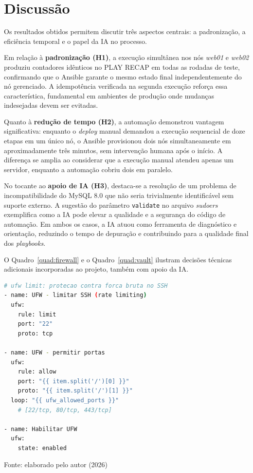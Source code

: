 \documentclass[12pt]{article}
\newenvironment{quadro}[1][H]
  {\begin{table}[#1]\centering}
  {\end{table}}
\newcommand{\fonte}[1]{%
  \begin{flushleft}
    \footnotesize Fonte: #1
  \end{flushleft}%
}
\begin{document}
\section{Discussão}

Os resultados obtidos permitem discutir três aspectos centrais: a
padronização, a eficiência temporal e o papel da IA no processo.

Em relação à \textbf{padronização (H1)}, a execução simultânea nos nós
\textit{web01} e \textit{web02} produziu contadores idênticos no PLAY RECAP
em todas as rodadas de teste, confirmando que o Ansible garante o mesmo
estado final independentemente do nó gerenciado. A idempotência verificada
na segunda execução reforça essa característica, fundamental em ambientes de
produção onde mudanças indesejadas devem ser evitadas.

Quanto à \textbf{redução de tempo (H2)}, a automação demonstrou vantagem
significativa: enquanto o \textit{deploy} manual demandou a execução
sequencial de doze etapas em um único nó, o Ansible provisionou dois nós
simultaneamente em aproximadamente três minutos, sem intervenção humana após
o início. A diferença se amplia ao considerar que a execução manual atendeu
apenas um servidor, enquanto a automação cobriu dois em paralelo.

No tocante ao \textbf{apoio de IA (H3)}, destaca-se a resolução de um
problema de incompatibilidade do MySQL 8.0 que não seria trivialmente
identificável sem suporte externo. A sugestão do parâmetro \texttt{validate}
no arquivo \textit{sudoers} exemplifica como a IA pode elevar a qualidade e
a segurança do código de automação. Em ambos os casos, a IA atuou como
ferramenta de diagnóstico e orientação, reduzindo o tempo de depuração e
contribuindo para a qualidade final dos \textit{playbooks}.

O Quadro~\ref{quad:firewall} e o Quadro~\ref{quad:vault} ilustram decisões
técnicas adicionais incorporadas ao projeto, também com apoio da IA.

\begin{quadro}[H]
  \caption{Configuração de \textit{firewall} com limitação de taxa no SSH}
  \label{quad:firewall}
  \begin{lstlisting}[language=bash]
# ufw limit: protecao contra forca bruta no SSH
- name: UFW - limitar SSH (rate limiting)
  ufw:
    rule: limit
    port: "22"
    proto: tcp

- name: UFW - permitir portas
  ufw:
    rule: allow
    port: "{{ item.split('/')[0] }}"
    proto: "{{ item.split('/')[1] }}"
  loop: "{{ ufw_allowed_ports }}"
    # [22/tcp, 80/tcp, 443/tcp]

- name: Habilitar UFW
  ufw:
    state: enabled
  \end{lstlisting}
  \fonte{elaborado pelo autor (2026)}
\end{quadro}
\end{document}
